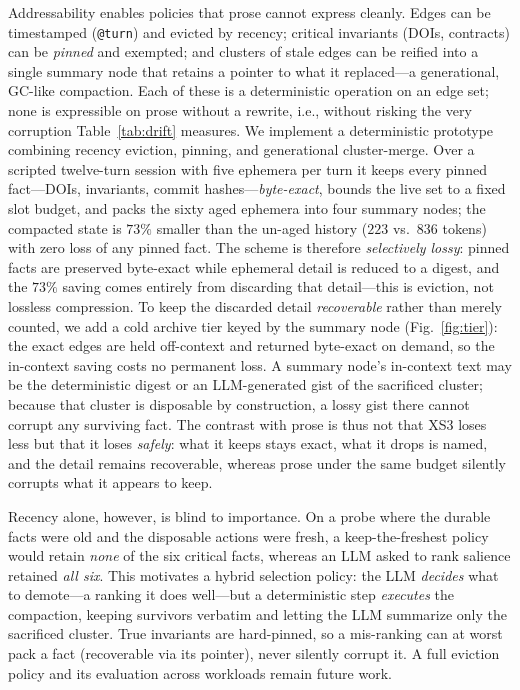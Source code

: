 \documentclass[conference]{IEEEtran}
\newcommand{\code}[1]{\texttt{#1}}
\begin{document}
Addressability enables policies that prose cannot express cleanly. Edges can be
timestamped (\code{@turn}) and evicted by recency; critical invariants (DOIs,
contracts) can be \emph{pinned} and exempted; and clusters of stale edges can be
reified into a single summary node that retains a pointer to what it replaced---a
generational, GC-like compaction. Each of these is a deterministic operation on
an edge set; none is expressible on prose without a rewrite, i.e., without
risking the very corruption Table~\ref{tab:drift} measures. We implement a
deterministic prototype combining recency eviction, pinning, and generational
cluster-merge. Over a scripted twelve-turn session with five ephemera per turn it
keeps every pinned fact---DOIs, invariants, commit hashes---\emph{byte-exact},
bounds the live set to a fixed slot budget, and packs the sixty aged ephemera
into four summary nodes; the compacted state is $73\%$ smaller than the un-aged
history ($223$ vs.\ $836$ tokens) with zero loss of any pinned fact. The scheme
is therefore \emph{selectively lossy}: pinned facts are preserved byte-exact
while ephemeral detail is reduced to a digest, and the $73\%$ saving comes
entirely from discarding that detail---this is eviction, not lossless
compression. To keep the discarded detail \emph{recoverable}
rather than merely counted, we add a cold archive tier keyed by the summary node
(Fig.~\ref{fig:tier}): the exact edges are held off-context and returned
byte-exact on demand, so the in-context saving costs no permanent loss. A summary
node's in-context text may be the deterministic digest or an LLM-generated gist
of the sacrificed cluster; because that cluster is disposable by construction, a
lossy gist there cannot corrupt any surviving fact. The contrast with prose is
thus not that XS3 loses less but that it loses \emph{safely}: what it keeps stays
exact, what it drops is named, and the detail remains recoverable, whereas prose
under the same budget silently corrupts what it appears to keep.

Recency alone, however, is blind to importance. On a probe where the durable
facts were old and the disposable actions were fresh, a keep-the-freshest policy
would retain \emph{none} of the six critical facts, whereas an LLM asked to rank
salience retained \emph{all six}. This motivates a hybrid selection policy: the
LLM \emph{decides} what to demote---a ranking it does well---but a deterministic
step \emph{executes} the compaction, keeping survivors verbatim and letting the
LLM summarize only the sacrificed cluster. True invariants are hard-pinned, so a
mis-ranking can at worst pack a fact (recoverable via its pointer), never
silently corrupt it. A full eviction policy and its evaluation across workloads
remain future work.
\end{document}
